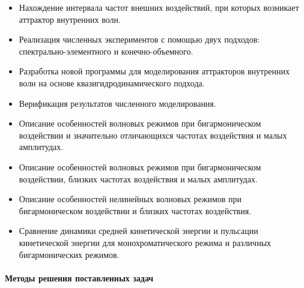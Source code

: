 \begin{itemize}

  \item Нахождение интервала частот внешних воздействий, при которых возникает аттрактор внутренних волн.
  

    
    
  \item Реализация численных экспериментов с помощью двух подходов: спектрально-элементного и конечно-объемного.

  \item Разработка новой программы для моделирования аттракторов внутренних волн на основе квазигидродинамического подхода.
    
  \item Верификация результатов численного моделирования.

  \item Описание особенностей волновых режимов при бигармоническом воздействии и значительно отличающихся частотах воздействия и малых амплитудах.

  \item Описание особенностей волновых режимов при бигармоническом воздействии, близких частотах воздействия и малых амплитудах.
    
  \item Описание особенностей нелинейных волновых режимов при бигармоническом воздействии и близких частотах воздействия.

  \item Сравнение динамики средней кинетической энергии и пульсации кинетической энергии для монохроматического режима и различных бигармонических режимов.
    

    
\end{itemize}

\paragraph{Методы решения поставленных задач}

